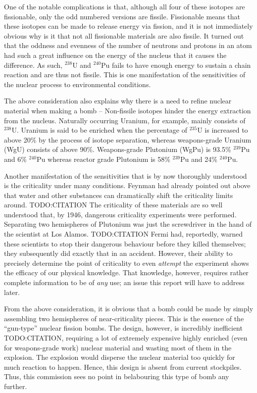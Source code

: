 \documentclass[twoside,titlepage,11pt,twocolumn,a4paper]{article}
\begin{document}
One of the notable complications is that, although all four of these
isotopes are fissionable, only the odd numbered versions are
fissile. Fissionable means that these isotopes can be made to release
energy via fission, and it is not immediately obvious why is it that
not all fissionable materials are also fissile. It turned out that the
oddness and evenness of the number of neutrons and protons in an atom
had such a great influence on the energy of the nucleus that it causes
the difference. As such, \( \mathrm{^{238}U} \) and \(
\mathrm{^{240}Pu} \) fails to have enough energy to sustain a chain
reaction and are thus not fissile. This is one manifestation of the
sensitivities of the nuclear process to environmental conditions.

The above consideration also explains why there is a need to refine
nuclear material when making a bomb -- Non-fissile isotopes hinder the
energy extraction from the nucleus. Naturally occurring Uranium, for
example, mainly consists of \( \mathrm{^{238}U} \).  Uranium is said
to be enriched when the percentage of \( \mathrm{^{235}U} \) is
increased to above 20\% by the process of isotope separation, whereas
weapons-grade Uranium (WgU) consists of above
90\%. \citep{blackmarket} Weapons-grade Plutonium (WgPu) is 93.5\% \(
\mathrm{^{239}Pu} \) and 6\% \( \mathrm{^{240}Pu} \) whereas reactor
grade Plutonium is 58\% \( \mathrm{^{239}Pu} \) and 24\% \(
\mathrm{^{240}Pu} \). \citep{drell1993}

Another manifestation of the sensitivities that is by now thoroughly
understood is the criticality under many conditions. Feynman had
already pointed out above that water and other substances can
dramatically shift the criticality limits around. TODO:CITATION The
criticality of these materials are so well understood that, by 1946,
dangerous criticality experiments were performed. Separating two
hemispheres of Plutonium was just the screwdriver in the hand of the
scientist at Los Alamos. TODO:CITATION Fermi had, reportedly, warned
these scientists to stop their dangerous behaviour before they killed
themselves; they subsequently did exactly that in an
accident. However, their ability to precisely determine the point of
criticality to even \emph{attempt} the experiment shows the efficacy
of our physical knowledge. That knowledge, however, requires rather
complete information to be of \emph{any} use; an issue this report
will have to address later.

From the above consideration, it is obvious that a bomb could be made
by simply assembling two hemispheres of near-criticality pieces. This
is the essence of the ``gun-type'' nuclear fission bombs. The design,
however, is incredibly inefficient TODO:CITATION, requiring a lot of
extremely expensive highly enriched (even for weapons-grade work)
nuclear material and wasting most of them in the explosion. The
explosion would disperse the nuclear material too quickly for much
reaction to happen. Hence, this design is absent from current
stockpiles. Thus, this commission sees no point in belabouring this
type of bomb any further.
\end{document}
